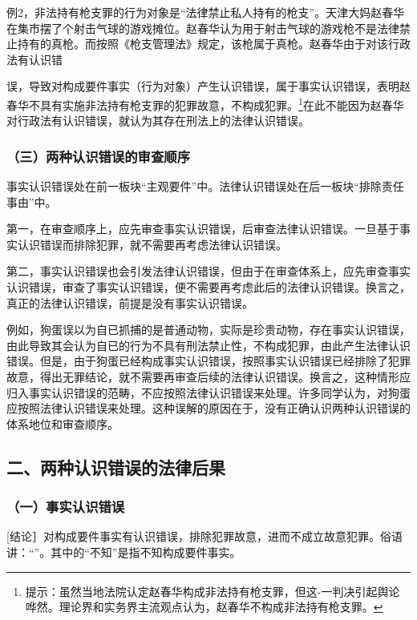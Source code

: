 例2，非法持有枪支罪的行为对象是“法律禁止私人持有的枪支”。天津大妈赵春华在集市摆了个射击气球的游戏摊位。赵春华认为用于射击气球的游戏枪不是法律禁止持有的真枪。而按照《枪支管理法》规定，该枪属于真枪。赵春华由于对该行政法有认识错

误，导致对构成要件事实（行为对象）产生认识错误，属于事实认识错误，表明赵春华不具有实施非法持有枪支罪的犯罪故意，不构成犯罪。\footnote{提示：虽然当地法院认定赵春华构成非法持有枪支罪，但这-一判决引起舆论哗然。理论界和实务界主流观点认为，赵春华不构成非法持有枪支罪。}在此不能因为赵春华对行政法有认识错误，就认为其存在刑法上的法律认识错误。

\subsubsection*{（三）两种认识错误的审查顺序}

事实认识错误处在前一板块“主观要件”中。法律认识错误处在后一板块“排除责任事由”中。

第一，在审查顺序上，应先审查事实认识错误，后审查法律认识错误。一旦基于事实认识错误而排除犯罪，就不需要再考虑法律认识错误。

第二，事实认识错误也会引发法律认识错误，但由于在审查体系上，应先审查事实认识错误，审查了事实认识错误，便不需要再考虑此后的法律认识错误。换言之，真正的法律认识错误，前提是没有事实认识错误。

例如，狗蛋误以为自已抓捕的是普通动物，实际是珍贵动物，存在事实认识错误，由此导致其会认为自已的行为不具有刑法禁止性，不构成犯罪，由此产生法律认识错误。但是，由于狗蛋已经构成事实认识错误，按照事实认识错误已经排除了犯罪故意，得出无罪结论，就不需要再审查后续的法律认识错误。换言之，这种情形应归入事实认识错误的范畴，不应按照法律认识错误来处理。许多同学认为，对狗蛋应按照法律认识错误来处理。这种误解的原因在于，没有正确认识两种认识错误的体系地位和审查顺序。

\subsection*{二、两种认识错误的法律后果}

\subsubsection*{（一）事实认识错误}

[结论］对构成要件事实有认识错误，排除犯罪故意，进而不成立故意犯罪。俗语讲：“”。其中的“不知”是指不知构成要件事实。

